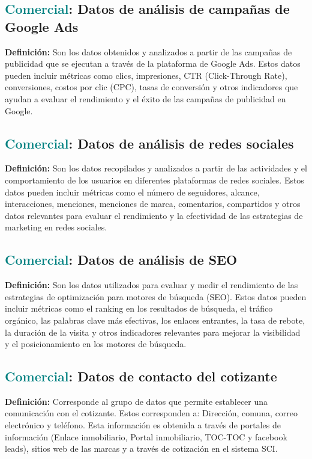\documentclass[12pt]{article}
\begin{document}
\subsection{\textcolor{teal}{Comercial}: Datos de análisis de campañas de Google Ads}
\textbf{Definición:} Son los datos obtenidos y analizados a partir de las campañas de publicidad que se ejecutan a través de la plataforma de Google Ads. Estos datos pueden incluir métricas como clics, impresiones, CTR (Click-Through Rate), conversiones, costos por clic (CPC), tasas de conversión y otros indicadores que ayudan a evaluar el rendimiento y el éxito de las campañas de publicidad en Google.
\subsection{\textcolor{teal}{Comercial}: Datos de análisis de redes sociales}
\textbf{Definición:} Son los datos recopilados y analizados a partir de las actividades y el comportamiento de los usuarios en diferentes plataformas de redes sociales. Estos datos pueden incluir métricas como el número de seguidores, alcance, interacciones, menciones, menciones de marca, comentarios, compartidos y otros datos relevantes para evaluar el rendimiento y la efectividad de las estrategias de marketing en redes sociales.
\subsection{\textcolor{teal}{Comercial}: Datos de análisis de SEO}
\textbf{Definición:} Son los datos utilizados para evaluar y medir el rendimiento de las estrategias de optimización para motores de búsqueda (SEO). Estos datos pueden incluir métricas como el ranking en los resultados de búsqueda, el tráfico orgánico, las palabras clave más efectivas, los enlaces entrantes, la tasa de rebote, la duración de la visita y otros indicadores relevantes para mejorar la visibilidad y el posicionamiento en los motores de búsqueda.
\subsection{\textcolor{teal}{Comercial}: Datos de contacto del cotizante}
\textbf{Definición:} Corresponde al grupo de datos que permite establecer una comunicación con el cotizante. Estos corresponden a: Dirección, comuna, correo electrónico y teléfono. Esta información es obtenida a través de portales de información (Enlace inmobiliario, Portal inmobiliario, TOC-TOC y facebook leads), sitios web de las marcas y a través de cotización en el sistema SCI.
\end{document}
